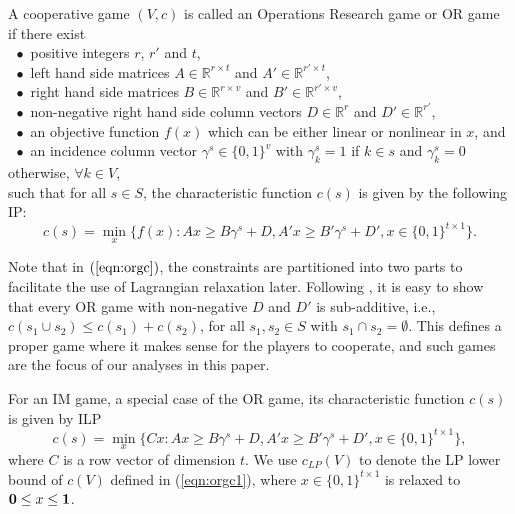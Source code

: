 \documentclass[ijoc,nonblindrev]{informs3} %
\newcommand{\R}{\mathbb{R}}
\begin{document}
\begin{definition}\label{def2}
A cooperative game $(V,c)$ is called an Operations Research game or OR game if there exist\\
$~~\bullet$ positive integers $r$, $r'$ and $t$,\\
$~~\bullet$ left hand side matrices $A \in \R^{r \times t}$ and $A' \in \R^{r' \times t}$,\\
$~~\bullet$ right hand side matrices $B \in \R^{r \times v}$ and $B' \in \R^{r' \times v}$,\\
$~~\bullet$ non-negative right hand side column vectors $D \in \R^{r}$ and $D' \in \R^{r'}$,\\
$~~\bullet$ an objective function $f(x)$ which can be either linear or nonlinear in $x$, and\\
$~~\bullet$ an incidence column vector $\gamma^s \in \{0,1\}^v$ with $\gamma_k^s=1$ if $k \in s$ and $\gamma_k^s=0$ otherwise, $\forall k \in V$,\\
such that for all $s \in S$, the characteristic function $c(s)$ is given by   the following IP:
\begin{equation}\label{eqn:orgc}
c(s) = \min_{x} \big\{ f(x):Ax \geq B\gamma^s + D, A'x \geq B'\gamma^s + D', x \in \{0,1\}^{t \times 1} \big\}.
\end{equation}
\end{definition}
Note that in $(\ref{eqn:orgc})$, the constraints are partitioned into two parts to facilitate the use of Lagrangian relaxation later. Following \cite{Caprara2010LPB}, it is easy to show that every OR game with non-negative $D$ and $D'$ is sub-additive, i.e., $c(s_1 \cup s_2) \leq c(s_1) + c(s_2)$, for all $s_1,s_2 \in S$ with $s_1 \cap s_2 = \emptyset$. This defines a proper game where it makes sense for the players to cooperate, and such games are the focus of our analyses in this paper.


For an IM game, a special case of the OR game, its characteristic function $c(s)$ is given by ILP
\begin{equation}\label{eqn:orgc1}
c(s) = \min_{x} \big\{ Cx:Ax \geq B\gamma^s + D, A'x \geq B'\gamma^s + D', x \in \{0,1\}^{t \times 1} \big\},
\end{equation}
where $C$ is a row vector of dimension $t$.  We use $c_{LP}(V)$ to denote the LP lower bound of $c(V)$ defined in (\ref{eqn:orgc1}), where $x \in \{0,1\}^{t \times 1}$ is relaxed to ${\bf 0}\leq x \leq {\bf 1}$.
\end{document}
